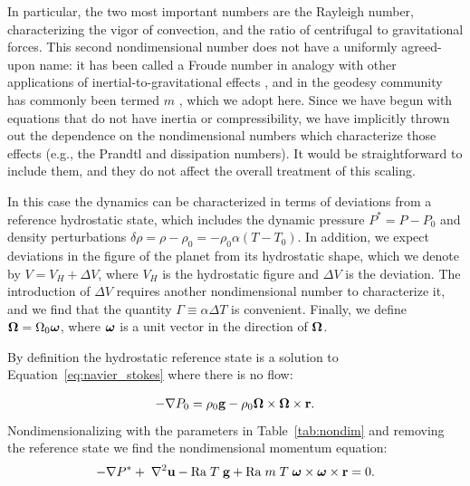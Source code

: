 \documentclass[extra,mreferee]{gji}
\begin{document}
In particular, the two most important numbers are the Rayleigh number, characterizing the vigor of convection, and the ratio of centrifugal to gravitational forces.
This second nondimensional number does not have a uniformly agreed-upon name: it has been called a Froude number in analogy with other applications of inertial-to-gravitational effects \citep{mckenzie1968influence}, 
and in the geodesy community has commonly been termed $m$ \citep[e.g.][]{nakiboglu1982hydrostatic, chambat2010flattening}, which we adopt here.
Since we have begun with equations that do not have inertia or compressibility, we have implicitly thrown out the dependence on the nondimensional numbers which characterize those effects (e.g., the Prandtl and dissipation numbers).
It would be straightforward to include them, and they do not affect the overall treatment of this scaling.

In this case the dynamics can be characterized in terms of deviations from a reference hydrostatic state, which includes the dynamic pressure $P^* = P - P_0$ and density perturbations $\delta \rho = \rho- \rho_0 = - \rho_0 \alpha (T-T_0)$.
In addition, we expect deviations in the figure of the planet from its hydrostatic shape, which we denote by $V = V_H + \Delta V$, where $V_H$ is the hydrostatic figure and $\Delta V$ is the deviation.
The introduction of $\Delta V$ requires another nondimensional number to characterize it, and we find that the quantity $\Gamma \equiv \alpha \Delta T$ is convenient.
Finally, we define $\mitbf{\Omega} = \Omega_0 \mitbf{\omega}$, where $\mitbf{\omega}$ is a unit vector in the direction of $\mitbf{\Omega}$.

By definition the hydrostatic reference state is a solution to Equation~\eqref{eq:navier_stokes} where there is no flow:

\begin{equation}
\begin{aligned}
- \nabla P_0 =  \rho_0 \mathbf{g} -  \rho_0 \mitbf{\Omega} \times \mitbf{\Omega} \times \mathbf{r}.
\label{eq:hydrostatic}
\end{aligned}
\end{equation}
Nondimensionalizing with the parameters in Table~\ref{tab:nondim} and removing the reference state we find the nondimensional momentum equation:
\begin{equation}
\begin{aligned}
 - \nabla P^* + \; \nabla^2 \mathbf{u} - \mathrm{Ra} \; T \; \mathbf{g} + \mathrm{Ra} \; m \; T \;{\mitbf{\omega} \times \mitbf{\omega} \times \mathbf{r}} = 0.
\end{aligned}
\end{equation}
\end{document}
